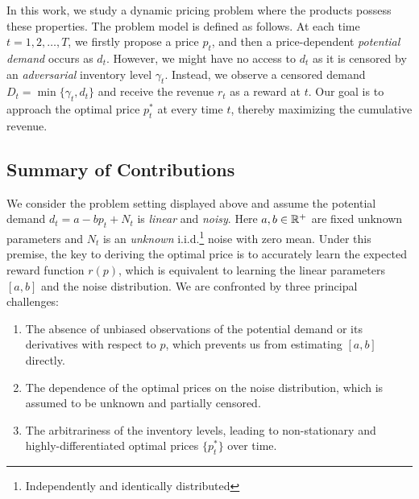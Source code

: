 In this work, we study a dynamic pricing problem where the products possess these properties. The problem model is defined as follows. At each time $t=1,2,\ldots, T$, we firstly propose a price $p_t$, and then a price-dependent \emph{potential demand} occurs as $d_t$. However, we might have no access to $d_t$ as it is censored by an \emph{adversarial} inventory level $\gamma_t$. Instead, we observe a censored demand $D_t = \min\{\gamma_t, d_t\}$ and receive the revenue $r_t$ as a reward at $t$. Our goal is to approach the optimal price $p_t^*$ at every time $t$, thereby maximizing the cumulative revenue.


\subsection{Summary of Contributions}
\label{subsec:summary_contribution}
We consider the problem setting displayed above and assume the potential demand $d_t=a-bp_t+N_t$ is \emph{linear} and \emph{noisy}. Here $a, b\in\mathbb{R}^+$ are fixed unknown parameters and $N_t$ is an \emph{unknown} i.i.d.\footnote{Independently and identically distributed} noise with zero mean. Under this premise, the key to deriving the optimal price is to accurately learn the expected reward function $r(p)$, which is equivalent to learning the linear parameters $[a,b]$ and the noise distribution. We are confronted by three principal challenges:

\begin{enumerate}
    \item The absence of unbiased observations of the potential demand or its derivatives with respect to $p$, which prevents us from estimating $[a,b]$ directly.
    \item The dependence of the optimal prices on the noise distribution, which is assumed to be unknown and partially censored. 
    \item The arbitrariness of the inventory levels, leading to non-stationary and highly-differentiated optimal prices $\{p_t^*\}$ over time.
\end{enumerate}

